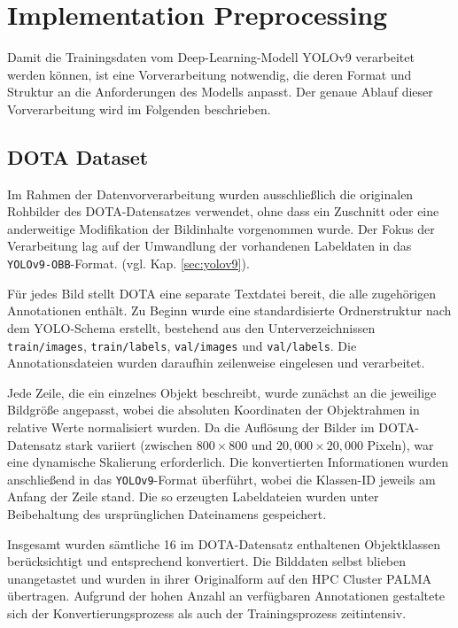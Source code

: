 

\section{Implementation Preprocessing}
Damit die Trainingsdaten vom Deep-Learning-Modell YOLOv9 verarbeitet werden können, ist eine Vorverarbeitung notwendig, die deren Format und Struktur an die Anforderungen des Modells anpasst. Der genaue Ablauf dieser Vorverarbeitung wird im Folgenden beschrieben.
\subsection{DOTA Dataset}
Im Rahmen der Datenvorverarbeitung wurden ausschließlich die originalen Rohbilder des \acrshort{DOTA}-Datensatzes verwendet, ohne dass ein Zuschnitt oder eine anderweitige Modifikation der Bildinhalte vorgenommen wurde. Der Fokus der Verarbeitung lag auf der Umwandlung der vorhandenen Labeldaten in das \texttt{YOLOv9-OBB}-Format. (vgl. Kap. \ref{sec:yolov9}).

Für jedes Bild stellt \acrshort{DOTA} eine separate Textdatei bereit, die alle zugehörigen Annotationen enthält. Zu Beginn wurde eine standardisierte Ordnerstruktur nach dem \acrshort{YOLO}-Schema erstellt, bestehend aus den Unterverzeichnissen \texttt{train/images}, \texttt{train/labels}, \texttt{val/images} und \texttt{val/labels}. Die Annotationsdateien wurden daraufhin zeilenweise eingelesen und verarbeitet.

Jede Zeile, die ein einzelnes Objekt beschreibt, wurde zunächst an die jeweilige Bildgröße angepasst, wobei die absoluten Koordinaten der Objektrahmen in relative Werte normalisiert wurden. Da die Auflösung der Bilder im \acrshort{DOTA}-Datensatz stark variiert (zwischen \(800 \times 800\) und \(20{,}000 \times 20{,}000\) Pixeln), war eine dynamische Skalierung erforderlich. Die konvertierten Informationen wurden anschließend in das \texttt{YOLOv9}-Format überführt, wobei die Klassen-ID jeweils am Anfang der Zeile stand. Die so erzeugten Labeldateien wurden unter Beibehaltung des ursprünglichen Dateinamens gespeichert.

Insgesamt wurden sämtliche 16 im \acrshort{DOTA}-Datensatz enthaltenen Objektklassen berücksichtigt und entsprechend konvertiert. Die Bilddaten selbst blieben unangetastet und wurden in ihrer Originalform auf den HPC Cluster \acrshort{PALMA} übertragen. Aufgrund der hohen Anzahl an verfügbaren Annotationen gestaltete sich der Konvertierungsprozess als auch der Trainingsprozess zeitintensiv.

